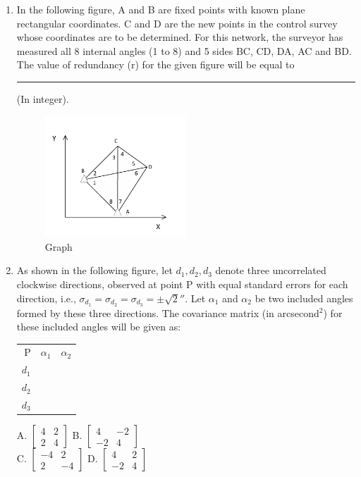 \documentclass[journal,12pt,onecolumn]{IEEEtran}
\begin{document}
\begin{enumerate}
    \item In the following figure, A and B are fixed points with known plane rectangular coordinates. C and D are the new points in the control survey whose coordinates are to be determined. For this network, the surveyor has measured all 8 internal angles (1 to 8) and 5 sides BC, CD, DA, AC and BD. The value of redundancy (r) for the given figure will be equal to \rule{3cm}{0.15mm} (In integer).

\begin{center}
\end{center}

\begin{figure}[h] 
    \centering
    \includegraphics[width=0.5\textwidth]{figs/qn27.png}
    \caption{Graph}
\label{fig:q27}
\end{figure}

    \item As shown in the following figure, let $d_1, d_2, d_3$ denote three uncorrelated clockwise directions, observed at point P with equal standard errors for each direction, i.e., $\sigma_{d_1} = \sigma_{d_2} = \sigma_{d_3} = \pm \sqrt{2}''$. Let $\alpha_1$ and $\alpha_2$ be two included angles formed by these three directions. The covariance matrix (in arcsecond$^2$) for these included angles will be given as:

\begin{tabular}{rl}
P & $\alpha_1 \quad \alpha_2$ \\
$d_1$ & \\
$d_2$ & \\
$d_3$ & 
\end{tabular}

A. $\begin{bmatrix} 4 & 2 \\ 2 & 4 \end{bmatrix}$ \quad
B. $\begin{bmatrix} 4 & -2 \\ -2 & 4 \end{bmatrix}$ \\
C. $\begin{bmatrix} -4 & 2 \\ 2 & -4 \end{bmatrix}$ \quad
D. $\begin{bmatrix} 4 & 2 \\ -2 & 4 \end{bmatrix}$


\end{enumerate}
\end{document}
